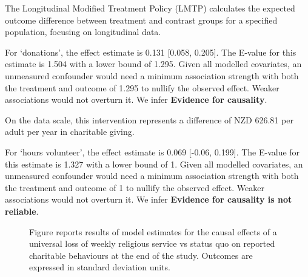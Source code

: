 \documentclass[
  singlecolumn]{article}
\begin{document}
The Longitudinal Modified Treatment Policy (LMTP) calculates the
expected outcome difference between treatment and contrast groups for a
specified population, focusing on longitudinal data.

For `donations', the effect estimate is 0.131 {[}0.058, 0.205{]}. The
E-value for this estimate is 1.504 with a lower bound of 1.295. Given
all modelled covariates, an unmeasured confounder would need a minimum
association strength with both the treatment and outcome of 1.295 to
nullify the observed effect. Weaker associations would not overturn it.
We infer \textbf{Evidence for causality}.

On the data scale, this intervention represents a difference of NZD
626.81 per adult per year in charitable giving.

For `hours volunteer', the effect estimate is 0.069 {[}-0.06, 0.199{]}.
The E-value for this estimate is 1.327 with a lower bound of 1. Given
all modelled covariates, an unmeasured confounder would need a minimum
association strength with both the treatment and outcome of 1 to nullify
the observed effect. Weaker associations would not overturn it. We infer
\textbf{Evidence for causality is not reliable}.

\newpage{}

\begin{figure}


\caption{\label{fig-1_3}Figure reports results of model estimates for
the causal effects of a universal loss of weekly religious service vs
status quo on reported charitable behaviours at the end of the study.
Outcomes are expressed in standard deviation units.}

\end{figure}%
\end{document}
